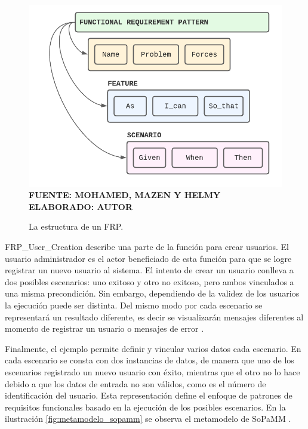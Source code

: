 \begin{figure}[h!]
	\centering
	\caption{La estructura de un FRP.}
	\includegraphics[width=12cm]{img/estructuraFRP.png}
	\label{fig:metamodelo}
	\vspace{4mm}
	{\footnotesize \textbf{\\ FUENTE: MOHAMED, MAZEN Y HELMY \cite{Mohamed} \\ ELABORADO: AUTOR}}
\end{figure} 

\sloppy
FRP\_User\_Creation describe una parte de la función para crear usuarios. El usuario administrador es el actor beneficiado de esta función para que se logre registrar un nuevo usuario al sistema. El intento de crear un usuario conlleva a dos posibles escenarios: uno exitoso y otro no exitoso, pero ambos vinculados a una misma precondición.  Sin embargo, dependiendo de la validez de los usuarios la ejecución puede ser distinta. Del mismo modo por cada escenario se representará un resultado diferente, es decir se visualizarán mensajes diferentes al momento de registrar un usuario o mensajes de error \cite{Mohamed}.

Finalmente, el ejemplo permite definir y vincular varios datos cada escenario. En cada escenario se consta con dos instancias de datos, de manera que uno de los escenarios registrado un nuevo usuario con éxito, mientras que el otro no lo hace debido a que los datos de entrada no son válidos, como es el número de identificación del usuario. Esta representación define el enfoque de patrones de requisitos funcionales basado en la ejecución de los posibles escenarios. En la ilustración \ref{fig:metamodelo_sopamm} se observa el metamodelo de SoPaMM \cite{Mohamed}.

